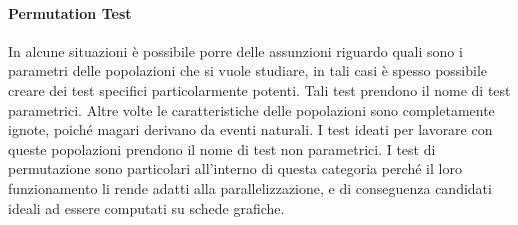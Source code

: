 \paragraph{Permutation Test}
In alcune situazioni è possibile porre delle assunzioni riguardo quali sono i parametri delle popolazioni che si vuole studiare, in tali casi è spesso possibile creare dei test specifici particolarmente potenti. Tali test prendono il nome di test parametrici.
Altre volte le caratteristiche delle popolazioni sono completamente ignote, poiché magari derivano da eventi naturali. I test ideati per lavorare con queste popolazioni prendono il nome di test non parametrici. 
I test di permutazione sono particolari all'interno di questa categoria perché il loro funzionamento li rende adatti alla parallelizzazione, e di conseguenza candidati ideali ad essere computati su schede grafiche.


